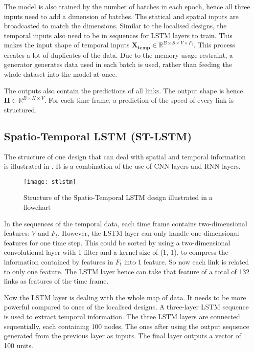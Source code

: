 The model is also trained by the number of batches in each epoch, hence all three inputs need to add a dimension of batches. 
The statical and spatial inputs are broadcasted to match the dimensions.
Similar to the localised designs, the temporal inputs also need to be in sequences for LSTM layers to train. 
This makes the input shape of temporal inputs $\mathbf{X_{temp}} \in \mathbb{R}^{B\times S\times V\times F_t}$. 
This process creates a lot of duplicates of the data. Due to the memory usage restraint, a generator generates data used in each batch is used, rather than feeding the whole dataset into the model at once.  

The outputs also contain the predictions of all links. The output shape is hence $\mathbf{H} \in \mathbb{R}^{B\times H\times V}$. 
For each time frame, a prediction of the speed of every link is structured. 

\subsection{Spatio-Temporal LSTM (ST-LSTM)}

The structure of one design that can deal with spatial and temporal information is illustrated in . 
It is a combination of the use of CNN layers and RNN layers. 

\begin{figure}[!htb]
    \centering
    \texttt{[image: stlstm]}
    \caption{Structure of the Spatio-Temporal LSTM design illustrated in a flowchart}
    \label{Figure:stlstm}
\end{figure}

In the sequences of the temporal data, each time frame contains two-dimensional features: $V$ and $F_t$. However, the LSTM layer can only handle one-dimensional features for one time step. 
This could be sorted by using a two-dimensional convolutional layer with 1 filter and a kernel size of (1, 1), to compress the information contained by features in $F_t$ into 1 feature. 
So now each link is related to only one feature. The LSTM layer hence can take that feature of a total of 132 links as features of the time frame. 

Now the LSTM layer is dealing with the whole map of data. It needs to be more powerful compared to ones of the localised designs. 
A three-layer LSTM sequence is used to extract temporal information. The three LSTM layers are connected sequentially, each containing 100 nodes,
The ones after using the output sequence generated from the previous layer as inputs. The final layer outputs a vector of 100 units. 

